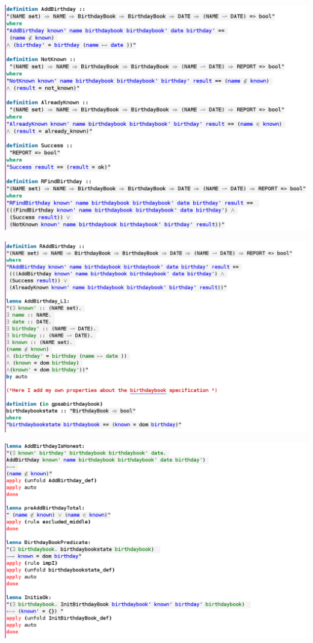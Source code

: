 \noindent \includegraphics[scale=0.4]{examples/bb/6imageb.png}

\noindent \includegraphics[scale=0.4]{examples/bb/6imagec.png}

\noindent \includegraphics[scale=0.4]{examples/bb/6imaged.png}

